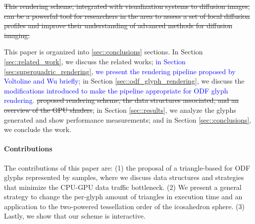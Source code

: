 \documentclass[twoside,twocolumn,10pt]{article}
\begin{document}
\sout{This rendering scheme, integrated with visualization systems to diffusion images, can be a powerful tool for researchers in the area to assess a set of local diffusion profiles and improve their understanding of advanced methods for diffusion imaging.}

This paper is organized into \ref{sec::conclusions} sections. In Section \ref{sec::related_work}, we discuss the related works; \textcolor{blue}{in Section \ref{sec:superquadric_rendering}, we present the rendering pipeline proposed by Voltoline and Wu briefly;} in Section \ref{sec::odf_glyph_rendering}, we discuss the \textcolor{blue}{modifications introduced to make the pipeline appropriate for ODF glyph rendering.} \sout{proposed rendering scheme, the data structures associated, and an overview of the GPU shaders}; in Section \ref{sec::results}, we analyze the glyphs generated and show performance measurements; and in  Section \ref{sec::conclusions}, we conclude the work.

\paragraph*{\textbf{Contributions}}

The contributions of this paper are: (1) the proposal of a triangle-based for ODF glyphs represented by samples, where we discuss data structures and strategies that minimize the CPU-GPU data traffic bottleneck. (2) We present a general strategy to change the per-glyph amount of triangles in execution time and an application to the two-powered tessellation order of the icosahedron sphere. (3) Lastly, we show that our scheme is interactive.







\end{document}
